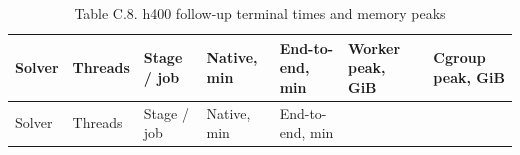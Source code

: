 \documentclass[
  english,
  11pt,
  a4paper,
]{article}
\begin{document}
\begin{longtable}[]{@{}
  >{\raggedright\arraybackslash}p{}
  >{\raggedleft\arraybackslash}p{}
  >{\raggedright\arraybackslash}p{}
  >{\raggedleft\arraybackslash}p{}
  >{\raggedleft\arraybackslash}p{}
  >{\raggedleft\arraybackslash}p{}
  >{\raggedleft\arraybackslash}p{}@{}}
\caption{Table C.8. h400 follow-up terminal times and memory peaks}\tabularnewline
\toprule\noalign{}
\begin{minipage}[b]{\linewidth}\raggedright
Solver
\end{minipage} & \begin{minipage}[b]{\linewidth}\raggedleft
Threads
\end{minipage} & \begin{minipage}[b]{\linewidth}\raggedright
Stage / job
\end{minipage} & \begin{minipage}[b]{\linewidth}\raggedleft
Native, min
\end{minipage} & \begin{minipage}[b]{\linewidth}\raggedleft
End-to-end, min
\end{minipage} & \begin{minipage}[b]{\linewidth}\raggedleft
Worker peak, GiB
\end{minipage} & \begin{minipage}[b]{\linewidth}\raggedleft
Cgroup peak, GiB
\end{minipage} \\
\midrule\noalign{}
\endfirsthead
\toprule\noalign{}
\begin{minipage}[b]{\linewidth}\raggedright
Solver
\end{minipage} & \begin{minipage}[b]{\linewidth}\raggedleft
Threads
\end{minipage} & \begin{minipage}[b]{\linewidth}\raggedright
Stage / job
\end{minipage} & \begin{minipage}[b]{\linewidth}\raggedleft
Native, min
\end{minipage} & \begin{minipage}[b]{\linewidth}\raggedleft
End-to-end, min
\end{minipage} & \begin{minipage}[b]{\linewidth}\raggedleft

\end{minipage}
\end{longtable}
\end{document}
